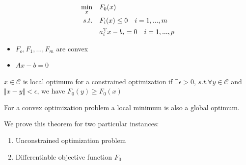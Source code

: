 


\begin{align*}
\min_x\quad & F_0(x) \\
s.t.\quad & F_i(x) \leq 0 \quad i = 1,...,m\\
& a_i^{{\rm T}}x - b_i = 0\quad i = 1,...,p
\end{align*}

\begin{itemize}
	\item $F_o, F_1,...,F_m$ are convex
	
	\item $Ax - b = 0$
\end{itemize}

\begin{definition}
	$x\in \mathcal{C}$ is local optimum for a constrained optimization if $\exists \epsilon > 0$, $s.t.\forall y\in \mathcal{C}$ and $\Vert x-y\Vert < \epsilon$, we have $F_0(y) \geq F_0(x)$
\end{definition}

\begin{theorem}
	For a convex optimization problem a local minimum is also a global optimum. 
\end{theorem}


We prove this theorem for two particular instances:
\begin{enumerate}
	\item Unconstrained optimization problem
	
	\item Differentiable objective function $F_0$
\end{enumerate}


